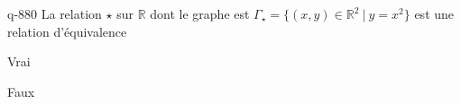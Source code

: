 \begin{truefalse}{q-880}
La relation $\star$ sur $\mathbb R$ dont le graphe est $\Gamma_\star=\{(x,y)\in\mathbb R^2\:|\: y=x^2\}$ est une relation d'équivalence
\item Vrai
\item* Faux
\end{truefalse}


